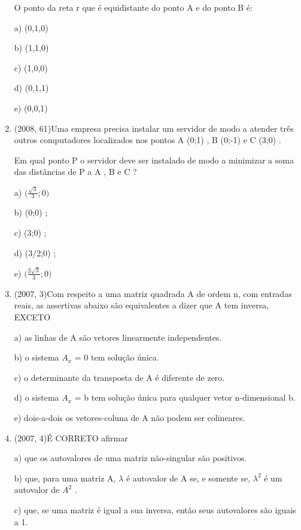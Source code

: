 \documentclass{article}
\begin{document}
\begin{enumerate}
O ponto da reta r que é equidistante do ponto  A e do ponto B é:

a) (0,1,0)

b) (1,1,0)

c) (1,0,0)

d) (0,1,1)

e) (0,0,1)\newline




\item(2008, 61)Uma empresa precisa instalar um servidor de modo a atender três outros computadores
localizados nos pontos A (0;1) , B (0;-1) e C (3;0) .

Em qual ponto P o servidor deve ser instalado de modo a minimizar a soma das
distâncias de P a A , B e C ?


a) $\bigg( \frac{\sqrt{3}}{3};0 \bigg)$

b) (0;0) ;

c) (3;0) ;

d) (3/2;0) ;

e) $\bigg( \frac{2\sqrt{3}}{3};0 \bigg)$







\item(2007, 3)Com respeito a uma matriz quadrada A de ordem n, com entradas reais, as assertivas abaixo são equivalentes a dizer que A tem inversa, EXCETO

a) as linhas de A são vetores linearmente independentes.

b) o sistema $A_x$ = 0 tem solução única.

c) o determinante da transposta de A é diferente de zero.

d) o sistema $A_x$ = b tem solução única para qualquer vetor n-dimensional b.

e) dois-a-dois os vetores-coluna de A não podem ser colineares.\newline



\item(2007, 4)É CORRETO afirmar

a) que os autovalores de uma matriz não-singular são positivos.

b) que, para uma matriz A, $\lambda$ é autovalor de A se, e somente se, $\lambda^2$  é um autovalor
de $A^2$ .

c) que, se uma matriz é igual a sua inversa, então seus autovalores são iguais a 1.


\end{enumerate}
\end{document}
